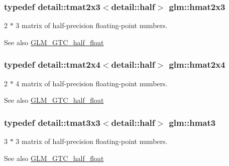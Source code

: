 \subsubsection[{hmat2x3}]{\setlength{\rightskip}{0pt plus 5cm}typedef detail\+::tmat2x3$<$detail\+::half$>$ {\bf glm\+::hmat2x3}}\label{group__gtc__half__float_ga620d92d90c323bb52a5a3c4df9b44bda}
2 $\ast$ 3 matrix of half-\/precision floating-\/point numbers. \begin{DoxySeeAlso}{See also}
\hyperlink{group__gtc__half__float}{G\+L\+M\+\_\+\+G\+T\+C\+\_\+half\+\_\+float} 
\end{DoxySeeAlso}
\hypertarget{group__gtc__half__float_gae4525d297f7612882ac1e58ad938ac10}{}
\subsubsection[{hmat2x4}]{\setlength{\rightskip}{0pt plus 5cm}typedef detail\+::tmat2x4$<$detail\+::half$>$ {\bf glm\+::hmat2x4}}\label{group__gtc__half__float_gae4525d297f7612882ac1e58ad938ac10}
2 $\ast$ 4 matrix of half-\/precision floating-\/point numbers. \begin{DoxySeeAlso}{See also}
\hyperlink{group__gtc__half__float}{G\+L\+M\+\_\+\+G\+T\+C\+\_\+half\+\_\+float} 
\end{DoxySeeAlso}
\hypertarget{group__gtc__half__float_gacbd67f9ac28573409d5d1eede2ec0fcd}{}
\subsubsection[{hmat3}]{\setlength{\rightskip}{0pt plus 5cm}typedef detail\+::tmat3x3$<$detail\+::half$>$ {\bf glm\+::hmat3}}\label{group__gtc__half__float_gacbd67f9ac28573409d5d1eede2ec0fcd}
3 $\ast$ 3 matrix of half-\/precision floating-\/point numbers. \begin{DoxySeeAlso}{See also}
\hyperlink{group__gtc__half__float}{G\+L\+M\+\_\+\+G\+T\+C\+\_\+half\+\_\+float} 
\end{DoxySeeAlso}
\hypertarget{group__gtc__half__float_ga70ae0376caa86bce1c8df390c7211321}{}
